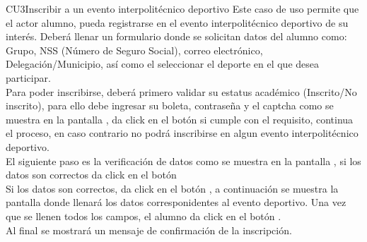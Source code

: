 \begin{UseCase}{CU3}{Inscribir a un evento interpolitécnico deportivo}{
		\noindent Este caso de uso permite que el actor alumno, pueda registrarse en el evento interpolitécnico deportivo de su interés. Deberá llenar un formulario donde se solicitan datos del alumno como: Grupo, NSS (Número de Seguro Social), correo electrónico, Delegación/Municipio, así como el seleccionar el deporte en el que desea participar.\\
        Para poder inscribirse, deberá primero validar su estatus académico (Inscrito/No inscrito), para ello debe ingresar su boleta, contraseña y el captcha como se muestra en la pantalla , da click en el botón  si cumple con el requisito, continua el proceso, en caso contrario no podrá inscribirse en algun evento interpolitécnico deportivo.\\
        El siguiente paso es la verificación de datos como se muestra en la pantalla , si los datos son correctos da click en el botón \\
        Si los datos son correctos, da click en el botón , a continuación se muestra la pantalla  donde llenará los datos corresponidentes al evento deportivo. Una vez que se llenen todos los campos, el alumno da click en el botón .\\ 
        Al final se mostrará un mensaje de confirmación de la inscripción.
	}
\end{UseCase}
